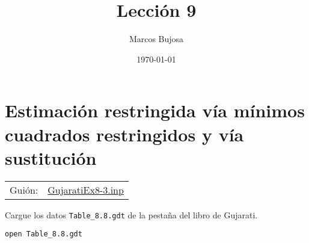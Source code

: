 \documentclass[11pt]{article}
\author{Marcos Bujosa}
\date{\today}
\title{Lección 9}
\begin{document}
\maketitle
\tableofcontents

\clearpage

\section{Estimación restringida vía mínimos cuadrados restringidos y vía sustitución}
\label{sec:orgde5c535}
\begin{center}
\begin{tabular}{ll}
Guión: & \href{https://github.com/mbujosab/Ectr/tree/master/Practicas/Gretl/scripts/GujaratiEx8-3.inp}{GujaratiEx8-3.inp}\\[0pt]
\end{tabular}
\end{center}

Cargue los datos \texttt{Table\_8.8.gdt} de la pestaña del libro de Gujarati.
\begin{verbatim}
open Table_8.8.gdt
\end{verbatim}
\end{document}
